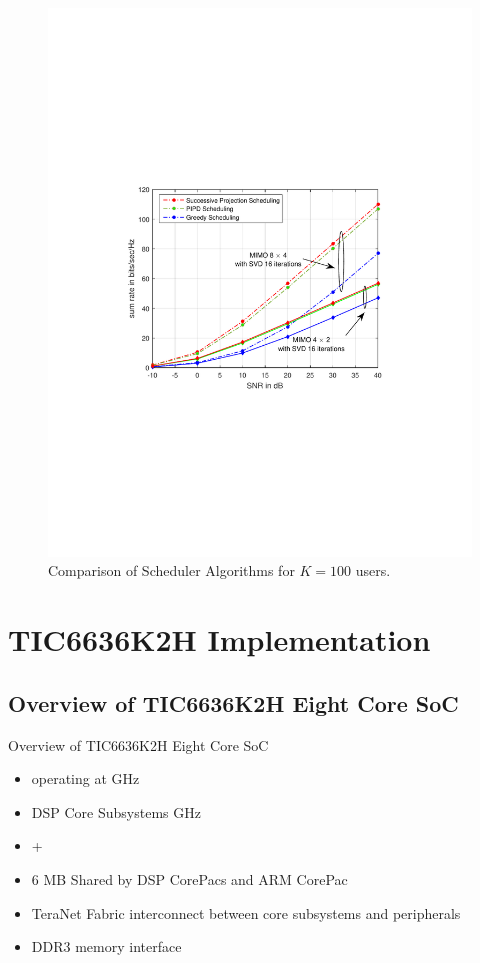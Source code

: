 \documentclass[11pt]{beamer}
\begin{document}
\begin{frame}
\begin{figure}
	\centering
	\caption{Comparison of Scheduler Algorithms for $K = 100$ users.}
	\includegraphics[trim=1.5in 3.5in 1.5in 3.5in,width=0.8\columnwidth]{sra_100}
\end{figure}
\end{frame}

\section{TIC6636K2H Implementation}

\subsection{Overview of TIC6636K2H Eight Core SoC}

\begin{frame}{Overview of TIC6636K2H Eight Core SoC}
	\begin{itemize}
		\item {} operating at \@ {}GHz
		\item {} DSP Core Subsystems \@ {}GHz
		\item {} + 
		\item 6 MB  Shared by DSP CorePacs and ARM CorePac
		\item TeraNet Fabric interconnect between core subsystems and peripherals
		\item DDR3 memory interface
	\end{itemize}
\end{frame}
\end{document}
